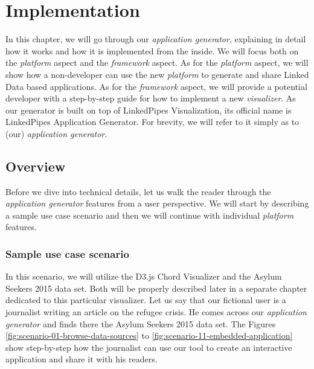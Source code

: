 \chapter{Implementation}

In this chapter, we will go through our \emph{application generator}, explaining in detail how it works and how it is implemented from the inside. We will focus both on the \emph{platform} aspect and the \emph{framework} aspect. As for the \emph{platform} aspect, we will show how a non-developer can use the new \emph{platform} to generate and share Linked Data based applications. As for the \emph{framework} aspect, we will provide a potential developer with a step-by-step guide for how to implement a new \emph{visualizer}. As our generator is built on top of LinkedPipes Visualization, its official name is LinkedPipes Application Generator. For brevity, we will refer to it simply as to (our) \emph{application generator}. 

\section{Overview}

Before we dive into technical details, let us walk the reader through the \emph{application generator} features from a user perspective. We will start by describing a sample use case scenario and then we will continue with individual \emph{platform} features.

\subsection{Sample use case scenario}
\label{sec:implementation:use-case-scenario}

In this scenario, we will utilize the D3.js Chord Visualizer and the Asylum Seekers 2015 data set. Both will be properly described later in a separate chapter dedicated to this particular visualizer. Let us say that our fictional user is a journalist writing an article on the refugee crisis. He comes across our \emph{application generator} and finds there the Asylum Seekers 2015 data set. The Figures \ref{fig:scenario-01-browse-data-sources} to \ref{fig:scenario-11-embedded-application} show step-by-step how the journalist can use our tool to create an interactive application and share it with his readers.

